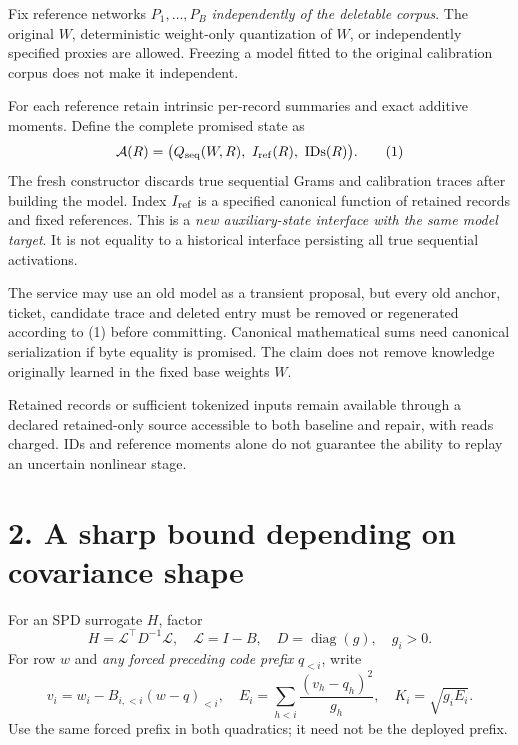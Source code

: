 \documentclass[11pt]{article}
\begin{document}
Fix reference networks $P_1,\ldots,P_B$ \emph{independently of the deletable corpus}. The original $W$, deterministic weight-only quantization of $W$, or independently specified proxies are allowed. Freezing a model fitted to the original calibration corpus does not make it independent.

For each reference retain intrinsic per-record summaries and exact additive moments. Define the complete promised state as
\[
 \mathcal A(R)=\big(Q_{\rm seq}(W,R),\ I_{\rm ref}(R),\ \mathrm{IDs}(R)\big). \tag{1}
\]
The fresh constructor discards true sequential Grams and calibration traces after building the model. Index $I_{\rm ref}$ is a specified canonical function of retained records and fixed references. This is a \emph{new auxiliary-state interface with the same model target}. It is not equality to a historical interface persisting all true sequential activations.

The service may use an old model as a transient proposal, but every old anchor, ticket, candidate trace and deleted entry must be removed or regenerated according to (1) before committing. Canonical mathematical sums need canonical serialization if byte equality is promised. The claim does not remove knowledge originally learned in the fixed base weights $W$.

Retained records or sufficient tokenized inputs remain available through a declared retained-only source accessible to both baseline and repair, with reads charged. IDs and reference moments alone do not guarantee the ability to replay an uncertain nonlinear stage.

\newpage
\section*{2. A sharp bound depending on covariance shape}
For an SPD surrogate $H$, factor
\[
 H=\mathcal L^{\top}D^{-1}\mathcal L,\quad
 \mathcal L=I-B,\quad D=\operatorname{diag}(g),\quad g_i>0.
\]
For row $w$ and \emph{any forced preceding code prefix} $q_{<i}$, write
\[
 v_i=w_i-B_{i,<i}(w-q)_{<i},\quad
 E_i=\sum_{h<i}\frac{(v_h-q_h)^2}{g_h},\quad K_i=\sqrt{g_i E_i}.
\]
Use the same forced prefix in both quadratics; it need not be the deployed prefix.
\end{document}
